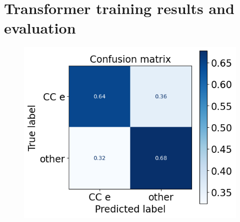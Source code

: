 \documentclass{pracalicmgr}
\begin{document}
\section{Transformer training results and evaluation}

\begin{figure}[H]
    \centering

    \begin{minipage}[t]{0.8\textwidth}
        \centering
        \includegraphics[width=\textwidth]{src/tranformerMatrixFinal.png}
        
    \end{minipage}

    \vspace{1cm}


\end{figure}
\end{document}
